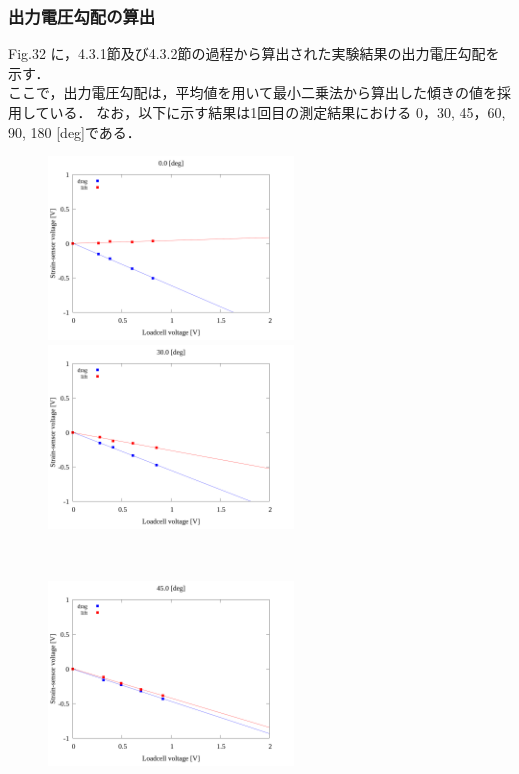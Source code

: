 \newpage

\subsubsection{出力電圧勾配の算出}

Fig.32 に，4.3.1節及び4.3.2節の過程から算出された実験結果の出力電圧勾配を示す．\\
ここで，出力電圧勾配は，平均値を用いて最小二乗法から算出した傾きの値を採用している．
なお，以下に示す結果は1回目の測定結果における 0，30, 45，60, 90, 180 [deg]である．

\begin{figure}[htbp]
  \begin{minipage}[b]{0.45\linewidth}
    \centering
    \includegraphics[width=65mm]{../../02_workspace/result/2-1/plot/04/04_linear_0.png}
  \end{minipage}
  \begin{minipage}[b]{0.45\linewidth}
    \centering
    \includegraphics[width=65mm]{../../02_workspace/result/2-1/plot/04/04_linear_300.png}
  \end{minipage} \\
  \begin{minipage}[b]{0.45\linewidth}
    \centering
    \includegraphics[width=65mm]{../../02_workspace/result/2-1/plot/04/04_linear_450.png}

\end{minipage}
\end{figure}
